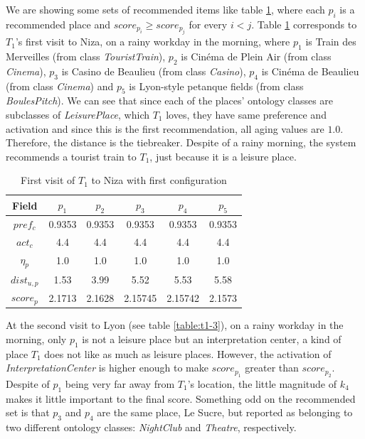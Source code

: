 We are showing some sets of recommended items like table \ref{table:t1-1}, where each $p_i$ is a recommended place and $score_{p_i} \ge score_{p_j}$ for every $i < j$. Table \ref{table:t1-1} corresponds to $T_1$'s first visit to Niza, on a rainy workday in the morning, where $p_1$ is Train des Merveilles (from class \textit{TouristTrain}), $p_2$ is Cinéma de Plein Air (from class \textit{Cinema}), $p_3$ is Casino de Beaulieu (from class \textit{Casino}), $p_4$ is Cinéma de Beaulieu (from class \textit{Cinema}) and $p_5$ is Lyon-style petanque fields (from class \textit{BoulesPitch}). We can see that since each of the places' ontology classes are subclasses of \textit{LeisurePlace}, which $T_1$ loves, they have same preference and activation and since this is the first recommendation, all aging values are $1.0$. Therefore, the distance is the tiebreaker. Despite of a rainy morning, the system recommends a tourist train to $T_1$, just because it is a leisure place.
\begin{table}[h!]
    \centering
    \begin{tabular}{ |c|c|c|c|c|c| } 
        \hline
        Field   & $p_1$ & $p_2$ & $p_3$ & $p_4$ & $p_5$ \\
        \hline
        $pref_c$    &  0.9353 & 0.9353 & 0.9353 & 0.9353 & 0.9353 \\
        $act_c$     & 4.4 & 4.4 & 4.4 & 4.4 & 4.4 \\
        $\eta_p$    & 1.0 & 1.0 & 1.0 & 1.0 & 1.0 \\
        $dist_{u,p}$ & 1.53 & 3.99 & 5.52 & 5.53 & 5.58 \\
        $score_p$    & 2.1713 & 2.1628 & 2.15745 & 2.15742 & 2.1573 \\
        
        \hline
    \end{tabular}
    \caption{First visit of $T_1$ to Niza with first configuration}
    \label{table:t1-1}
\end{table}


At the second visit to Lyon (see table \ref{table:t1-3}), on a rainy workday in the morning, only $p_1$ is not a leisure place but an interpretation center, a kind of place $T_1$ does not like as much as leisure places. However, the activation of \textit{InterpretationCenter} is higher enough to make $score_{p_1}$ greater than $score_{p_2}$. Despite of $p_1$ being very far away from $T_1$'s location, the little magnitude of $k_4$ makes it little important to the final score. Something odd on the recommended set is that $p_3$ and $p_4$ are the same place, Le Sucre, but reported as belonging to two different ontology classes: \textit{NightClub} and \textit{Theatre}, respectively.


